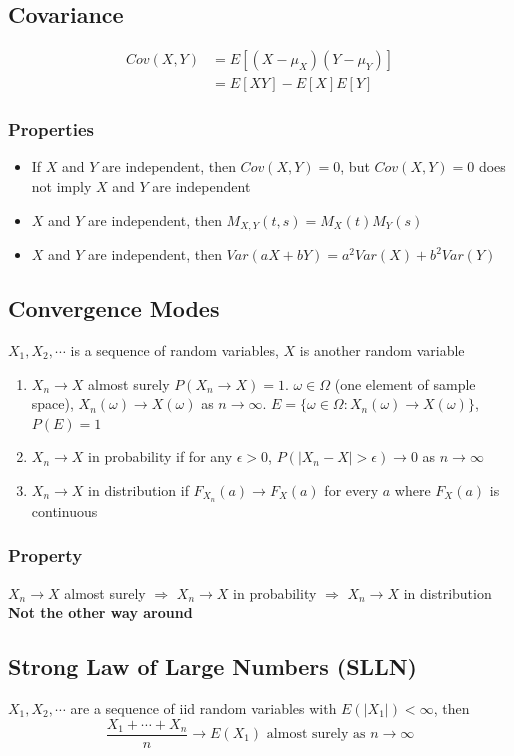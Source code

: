 \documentclass[11pt]{article}
\begin{document}
\subsection{Covariance}
\begin{align*}
    Cov(X,Y) &= E[(X-\mu_X)(Y-\mu_Y)] \\
             &= E[XY] - E[X]E[Y]
\end{align*}
\subsubsection{Properties}
\begin{itemize}
    \item If $X$ and $Y$ are independent, then $Cov(X,Y)=0$, but $Cov(X,Y)=0$ does not imply $X$ and $Y$ are independent
    \item $X$ and $Y$ are independent, then $M_{X,Y}(t,s)=M_X(t)M_Y(s)$
    \item $X$ and $Y$ are independent, then $Var(aX+bY)=a^2Var(X)+b^2Var(Y)$
\end{itemize}
\subsection{Convergence Modes}
$X_1,X_2,\cdots$ is a sequence of random variables, $X$ is another random variable 
\begin{enumerate}
    \item $X_n\to X$ almost surely $P(X_n\to X)=1$. $\omega\in\Omega$ (one element of sample space), $X_n(\omega)\to X(\omega)$ as $n\to\infty$. $E=\{\omega\in\Omega: X_n(\omega)\to X(\omega)\}$, $P(E)=1$
    \item $X_n\to X$ in probability if for any $\epsilon>0$, $P(|X_n-X|>\epsilon)\to 0$ as $n\to\infty$
    \item $X_n\to X$ in distribution if $F_{X_n}(a)\to F_X(a)$ for every $a$ where $F_X(a)$ is continuous
\end{enumerate}
\subsubsection{Property}
$X_n\to X$ almost surely $\Rightarrow$ $X_n\to X$ in probability $\Rightarrow$ $X_n\to X$ in distribution \\
\textbf{Not the other way around}
\subsection{Strong Law of Large Numbers (SLLN)}
$X_1,X_2,\cdots$ are a sequence of iid random variables with $E(|X_1|)<\infty$, then 
\[\dfrac{X_1+\cdots+X_n}{n}\to E(X_1)\text{ almost surely as }n\to\infty\]
\newpage 
\end{document}

